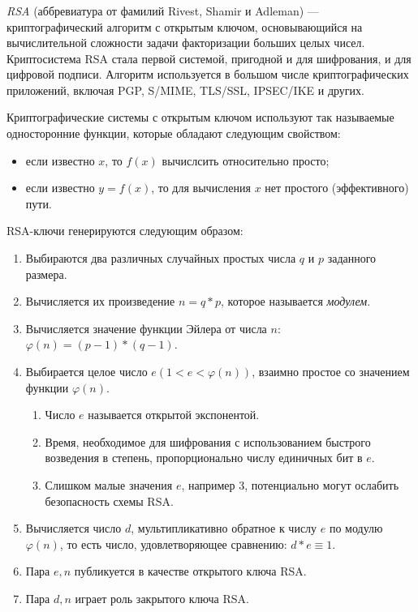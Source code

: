 \subsubsection{}
\label{sec:analysis:research:crypto:rsa}

\emph{RSA} (аббревиатура от фамилий Rivest, Shamir и Adleman) — криптографический алгоритм с открытым ключом, основывающийся на вычислительной сложности задачи факторизации больших целых чисел. Криптосистема RSA стала первой системой, пригодной и для шифрования, и для цифровой подписи. Алгоритм используется в большом числе криптографических приложений, включая PGP, S/MIME, TLS/SSL, IPSEC/IKE и других. \cite{wiki:rsa}

Криптографические системы с открытым ключом используют так называемые односторонние функции, которые обладают следующим свойством:
\begin{itemize}
	\item если известно \(x\), то \(f(x)\) вычислсить относительно просто;
	\item если известно \(y=f(x)\), то для вычисления \(x\) нет простого (эффективного) пути.
\end{itemize}

RSA-ключи генерируются следующим образом:
\begin{enumerate}
	\item Выбираются два различных случайных простых числа \(q\) и \(p\) заданного размера.
	\item Вычисляется их произведение \(n=q*p\), которое называется \emph{модулем}.
	\item Вычисляется значение функции Эйлера от числа \(n\): \(\varphi(n)=(p-1)*(q-1)\).
	\item Выбирается целое число \(e (1 < e < \varphi(n))\), взаимно простое со значением функции \(\varphi(n)\).
	\begin{enumerate}
		\item Число \(e\) называется открытой экспонентой.
		\item Время, необходимое для шифрования с использованием быстрого возведения в степень, пропорционально числу единичных бит в \(e\).
		\item Слишком малые значения \(e\), например 3, потенциально могут ослабить безопасность схемы RSA.
	\end{enumerate}
	\item Вычисляется число \(d\), мультипликативно обратное к числу \(e\) по модулю  \(\varphi(n)\), то есть число, удовлетворяющее сравнению: \(d*e \equiv 1\).
	\item Пара \({e,n}\) публикуется в качестве открытого ключа RSA.
	\item Пара \({d,n}\)  играет роль закрытого ключа RSA.
\end{enumerate}

